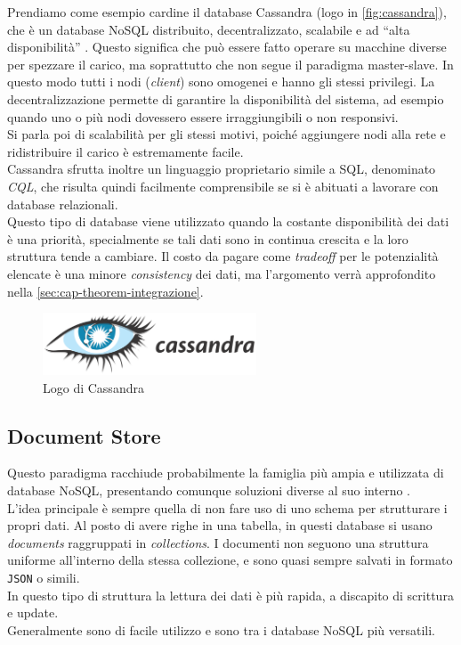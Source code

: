 \noindent Prendiamo come esempio cardine il database Cassandra (logo in \autoref{fig:cassandra}), che è un database NoSQL distribuito, decentralizzato, scalabile e ad ``alta disponibilità'' \cite{site:udemycassandra}. Questo significa che può essere fatto operare su macchine diverse per spezzare il carico, ma soprattutto che non segue il paradigma \gls{master-slave}. In questo modo tutti i nodi (\textit{client}) sono omogenei e hanno gli stessi privilegi. La decentralizzazione permette di garantire la disponibilità del sistema, ad esempio quando uno o più nodi dovessero essere irraggiungibili o non responsivi.\\
Si parla poi di scalabilità per gli stessi motivi, poiché aggiungere nodi alla rete e ridistribuire il carico è estremamente facile.\\
Cassandra sfrutta inoltre un linguaggio proprietario simile a \gls{SQL}, denominato \textit{CQL}, che risulta quindi facilmente comprensibile se si è abituati a lavorare con database relazionali.\\

\noindent Questo tipo di database viene utilizzato quando la costante disponibilità dei dati è una priorità, specialmente se tali dati sono in continua crescita e la loro struttura tende a cambiare. Il costo da pagare come \textit{tradeoff} per le potenzialità elencate è una minore \textit{consistency} dei dati, ma l'argomento verrà approfondito nella \autoref{sec:cap-theorem-integrazione}.

\begin{figure}[htbp]
\begin{center}
\includegraphics[height=5em]{immagini/tecnologies-logos/Cassandra-Logo-h.png}
\caption{Logo di Cassandra}
\label{fig:cassandra}
\end{center}
\end{figure}

\subsection{Document Store}
Questo paradigma racchiude probabilmente la famiglia più ampia e utilizzata di database NoSQL, presentando comunque soluzioni diverse al suo interno \cite{site:mongoarticletypes}.\\
L'idea principale è sempre quella di non fare uso di uno schema per strutturare i propri dati. Al posto di avere righe in una tabella, in questi database si usano \textit{documents} raggruppati in \textit{collections}. I documenti non seguono una struttura uniforme all'interno della stessa collezione, e sono quasi sempre salvati in formato \texttt{JSON} o simili.\\
In questo tipo di struttura la lettura dei dati è più rapida, a discapito di scrittura e update.\\
Generalmente sono di facile utilizzo e sono tra i database NoSQL più versatili.\\

